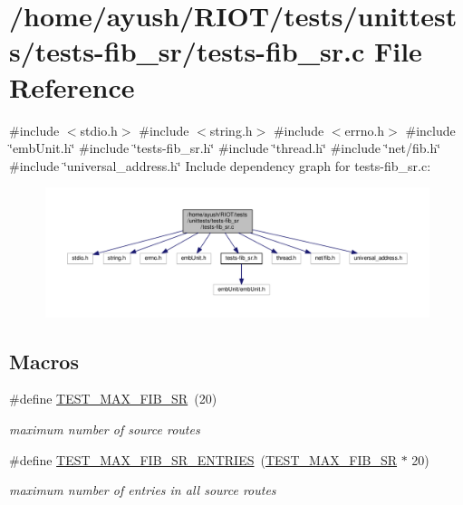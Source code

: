 \hypertarget{tests-fib__sr_8c}{}\section{/home/ayush/\+R\+I\+O\+T/tests/unittests/tests-\/fib\+\_\+sr/tests-\/fib\+\_\+sr.c File Reference}
\label{tests-fib__sr_8c}
{\ttfamily \#include $<$stdio.\+h$>$}\newline
{\ttfamily \#include $<$string.\+h$>$}\newline
{\ttfamily \#include $<$errno.\+h$>$}\newline
{\ttfamily \#include \char`\"{}emb\+Unit.\+h\char`\"{}}\newline
{\ttfamily \#include \char`\"{}tests-\/fib\+\_\+sr.\+h\char`\"{}}\newline
{\ttfamily \#include \char`\"{}thread.\+h\char`\"{}}\newline
{\ttfamily \#include \char`\"{}net/fib.\+h\char`\"{}}\newline
{\ttfamily \#include \char`\"{}universal\+\_\+address.\+h\char`\"{}}\newline
Include dependency graph for tests-\/fib\+\_\+sr.c\+:
\nopagebreak
\begin{figure}[H]
\begin{center}
\leavevmode
\includegraphics[width=350pt]{tests-fib__sr_8c__incl}
\end{center}
\end{figure}
\subsection*{Macros}
\begin{DoxyCompactItemize}
\item 
\#define \hyperlink{tests-fib__sr_8c_aa8679d92c7fab6c82b146daa69821eef}{T\+E\+S\+T\+\_\+\+M\+A\+X\+\_\+\+F\+I\+B\+\_\+\+SR}~(20)
\begin{DoxyCompactList}\small\item\em maximum number of source routes \end{DoxyCompactList}\item 
\#define \hyperlink{tests-fib__sr_8c_a1206b7ee83ad53daf8b2a8fc1f07483c}{T\+E\+S\+T\+\_\+\+M\+A\+X\+\_\+\+F\+I\+B\+\_\+\+S\+R\+\_\+\+E\+N\+T\+R\+I\+ES}~(\hyperlink{tests-fib__sr_8c_aa8679d92c7fab6c82b146daa69821eef}{T\+E\+S\+T\+\_\+\+M\+A\+X\+\_\+\+F\+I\+B\+\_\+\+SR} $\ast$ 20)
\begin{DoxyCompactList}\small\item\em maximum number of entries in all source routes \end{DoxyCompactList}\end{DoxyCompactItemize}
